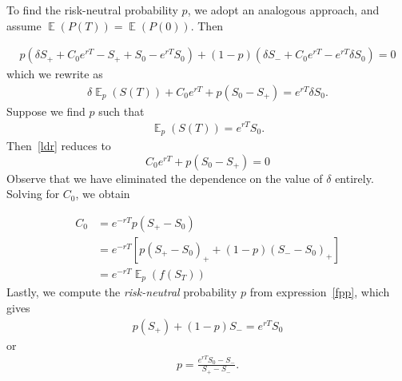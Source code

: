 \documentclass[12pt]{article}
\DeclareMathOperator{\ex}{\mathbb{E}}
\theoremstyle{plain}
\theoremstyle{definition}
\theoremstyle{remark}
\numberwithin{equation}{section}  %
\begin{document}
To find the risk-neutral probability $p$, we adopt an analogous approach,
and assume $\ex(P(T)) = \ex(P(0))$. Then

\begin{equation*}
\begin{split}
	p(\delta S_{+} + C_{0} e^{rT} - S_{+} + S_{0} - e^{rT}S_{0})
	+ (1-p)(\delta S_{-} + C_{0} e^{rT} - e^{rT} \delta S_{0}) = 0
\end{split}
\end{equation*}
which we rewrite as
\begin{equation}
	\label{ldr}
\begin{split}
	\delta \ex_{p}(S(T)) + C_{0} e^{rT} + p(S_{0} - S_{+}) = e^{rT} \delta
	S_{0}.
\end{split}
\end{equation}
Suppose we find $p$ such that 
\begin{equation}\label{fpp}
\begin{split}
	\ex_{p}(S(T)) = e^{rT} S_{0}.
\end{split}
\end{equation}
Then~\eqref{ldr} reduces to
\begin{equation*}
	 C_{0} e^{rT} + p(S_{0} - S_{+}) = 0 
\end{equation*}
Observe that we have eliminated the dependence on the value of $\delta$
entirely. Solving for $C_{0}$, we obtain

\begin{equation*}
\begin{split}
	C_{0} &= e^{-rT} p (S_{+} - S_{0})
	\\
	& = e^{-rT}\left[ p {(S_{+} - S_{0})}_{+}+(1-p){(S_{-} - S_{0})}_{+}\right]
	\\
	& = e^{-rT} \ex_{p}(f(S_{T}))
\end{split}
\end{equation*}
Lastly, we compute the \emph{risk-neutral} probability $p$ from expression~\eqref{fpp}, which gives
\begin{equation*}
\begin{split}
	p(S_{+}) + (1 -p)S_{-} = e^{rT} S_{0}
\end{split}
\end{equation*}
or
\begin{equation}\label{step-prob}
\begin{split}
	p = \frac{e^{rT} S_{0} - S_{-}}{S_{+} - S_{-}}.
\end{split}
\end{equation}
\end{document}
